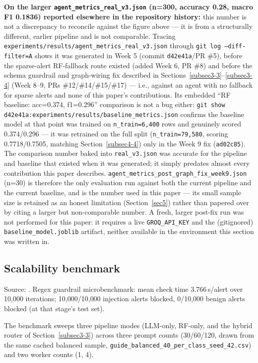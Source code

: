 \documentclass[twocolumn]{svjour3}
\begin{document}
\noindent\textbf{On the larger \texttt{agent\_metrics\_real\_v3.json} (n=300, accuracy 0.28, macro F1 0.1836) reported elsewhere in the repository history:} this number is not a discrepancy to reconcile against the figure above --- it is from a structurally different, earlier pipeline and is not comparable. Tracing \texttt{experiments/results/agent\_metrics\_real\_v3.json} through \texttt{git log --diff-filter=A} shows it was generated in Week 5 (commit \texttt{d42e41a}/PR \#5), before the sparse-alert RF-fallback route existed (added Week 6, PR \#8) and before the schema guardrail and graph-wiring fix described in Sections~\ref{subsec3-3}--\ref{subsec3-4} (Week 8--9, PRs \#12/\#14/\#15/\#17) --- i.e., against an agent with no fallback for sparse alerts and none of this paper's contributions. Its embedded ``RF baseline: acc=0.374, f1=0.296'' comparison is not a bug either: \texttt{git show d42e41a:experiments/results/baseline\_metrics.json} confirms the baseline model at that point was trained on \texttt{n\_train=6{,}400} rows and genuinely scored 0.374/0.296 --- it was retrained on the full split (\texttt{n\_train=79{,}580}, scoring 0.7718/0.7505, matching Section~\ref{subsec4-4}) only in the Week 9 fix (\texttt{ad02c85}). The comparison number baked into \texttt{real\_v3.json} was accurate for the pipeline and baseline that existed when it was generated; it simply predates almost every contribution this paper describes. \texttt{agent\_metrics\_post\_graph\_fix\_week9.json} (n=30) is therefore the only evaluation run against both the current pipeline and the current baseline, and is the number used in this paper --- its small sample size is retained as an honest limitation (Section~\ref{sec5}) rather than papered over by citing a larger but non-comparable number. A fresh, larger post-fix run was not performed for this paper: it requires a live \texttt{GROQ\_API\_KEY} and the (gitignored) \texttt{baseline\_model.joblib} artifact, neither available in the environment this section was written in.

\subsection{Scalability benchmark}\label{subsec4-6}
Source: . Regex guardrail microbenchmark: mean check time 3.766\,\textmu s/alert over 10{,}000 iterations; 10{,}000/10{,}000 injection alerts blocked, 0/10{,}000 benign alerts blocked (at that stage's test set).

The benchmark sweeps three pipeline modes (LLM-only, RF-only, and the hybrid router of Section~\ref{subsec3-3}) across three prompt counts (30/60/120, drawn from the same cached balanced sample, \texttt{guide\_balanced\_40\_per\_class\_seed\_42.csv}) and two worker counts (1, 4).
\end{document}

